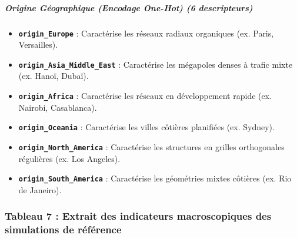 \documentclass[10pt, a4paper]{article}
\providecommand{\tightlist}{}
\begin{document}
\subparagraph{Origine Géographique (Encodage One-Hot) (6
descripteurs)}\label{origine-guxe9ographique-encodage-one-hot-6-descripteurs-1}

\begin{itemize}
\tightlist
\item
  \textbf{\texttt{origin\_Europe}} : Caractérise les réseaux radiaux
  organiques (ex. Paris, Versailles).
\item
  \textbf{\texttt{origin\_Asia\_Middle\_East}} : Caractérise les
  mégapoles denses à trafic mixte (ex. Hanoï, Dubaï).
\item
  \textbf{\texttt{origin\_Africa}} : Caractérise les réseaux en
  développement rapide (ex. Nairobi, Casablanca).
\item
  \textbf{\texttt{origin\_Oceania}} : Caractérise les villes côtières
  planifiées (ex. Sydney).
\item
  \textbf{\texttt{origin\_North\_America}} : Caractérise les structures
  en grilles orthogonales régulières (ex. Los Angeles).
\item
  \textbf{\texttt{origin\_South\_America}} : Caractérise les géométries
  mixtes côtières (ex. Rio de Janeiro).
\end{itemize}

\subsubsection{Tableau 7 : Extrait des indicateurs macroscopiques des
simulations de
référence}\label{tableau-7-extrait-des-indicateurs-macroscopiques-des-simulations-de-ruxe9fuxe9rence}
\end{document}
